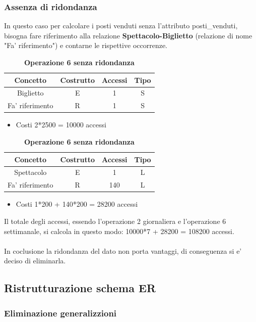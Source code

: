\documentclass[10pt]{article}
\begin{document}
	\subsubsection{Assenza di ridondanza}
	In questo caso per calcolare i posti venduti senza l'attributo posti\_venduti, bisogna fare riferimento alla relazione \textbf{Spettacolo-Biglietto} (relazione di nome "Fa' riferimento") e contarne le rispettive occorrenze.	
	\begin{table}[h!]
		\centering
		\caption{\textbf{Operazione 2 senza ridondanza}} \label{tab:Op2 w/o ridondanza}
		\begin{tabular}{|c|c|c|c|}
			\hline
			\textbf{Concetto} & \textbf{Costrutto} & \textbf{Accessi} & \textbf{Tipo} \\
			\hline
			Biglietto & E & 1 & S \\
			\hline
			Fa' riferimento & R & 1 & S \\
			\hline
		\end{tabular}
		\begin{itemize}
			\item Costi 2*2500 = 10000 accessi 
		\end{itemize}
		\caption{\textbf{Operazione 6 senza ridondanza}} \label{tab:Op6 w/o ridondanza}
		\begin{tabular}{|c|c|c|c|}
			\hline
			\textbf{Concetto} & \textbf{Costrutto} & \textbf{Accessi} & \textbf{Tipo} \\
			\hline
			Spettacolo & E & 1 & L \\
			\hline
			Fa' riferimento & R &140&L\\
			\hline
		\end{tabular}
		\begin{itemize}
			\item Costi 1*200 + 140*200 = 28200 accessi
		\end{itemize}
	\end{table}

	Il totale degli accessi, essendo l'operazione 2 giornaliera e l'operazione 6 settimanale, si calcola in questo modo: 10000*7 + 28200 = 108200 accessi.\\\\
	In coclusione la ridondanza del dato non porta vantaggi, di conseguenza si e' deciso di eliminarla.
	\subsection{Ristrutturazione schema ER}
	\subsubsection{Eliminazione generalizzioni}
\end{document}
